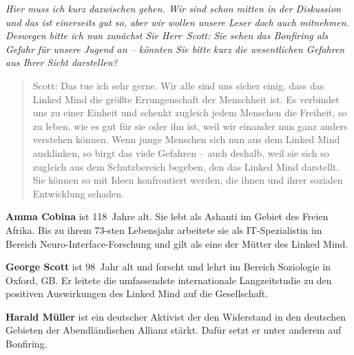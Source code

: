 \documentclass{scrartcl}
\newenvironment{frage}{\itshape}{}
\newenvironment{antworta}{
  \begin{quotation}
  }{
  \end{quotation}
}
\newcommand{\name}[1]{\textbf{#1}}
\newenvironment{infobox}{%
  \begin{tcolorbox}[width=\linewidth,
     boxsep=10pt,
     left=0pt,
     right=0pt,
     top=10pt,
     title=Zu den Personen,
     ]%
   }{%
   \end{tcolorbox}%
}
\begin{document}
\begin{frage}
Hier muss ich kurz dazwischen gehen. Wir sind schon mitten
  in der Diskussion und das ist einerseits gut so, aber wir
  wollen unsere Leser doch auch mitnehmen. Deswegen bitte
  ich nun zunächst Sie Herr~Scott: Sie sehen das Bonfiring
  als Gefahr für unsere Jugend an – könnten Sie bitte kurz
  die wesentlichen Gefahren aus Ihrer Sicht darstellen?
\end{frage}


\begin{antworta}
Scott: Das tue ich sehr gerne. Wir alle sind uns sicher
    einig, dass das Linked Mind die größte Errungenschaft
    der Menschheit ist. Es verbindet uns zu einer Einheit
    und schenkt zugleich jedem Menschen die Freiheit, so zu
    leben, wie es gut für sie oder ihn ist, weil wir
    einander nun ganz anders verstehen können. Wenn junge
    Menschen sich nun aus dem Linked Mind ausklinken, so
    birgt das viele Gefahren – auch deshalb, weil sie sich
    so zugleich aus dem Schutzbereich begeben, den das
    Linked Mind darstellt. Sie können so mit Ideen
    konfrontiert werden, die ihnen und ihrer sozialen
    Entwicklung schaden.
\end{antworta}


\begin{infobox}
\name{Amma Cobina} ist 118~Jahre alt. Sie lebt als Ashanti im
Gebiet des Freien Afrika. Bis zu ihrem 73-sten Lebensjahr
arbeitete sie als IT-Spezialistin im Bereich
Neuro-Interface-Forschung und gilt als eine der Mütter des
Linked Mind.

\name{George Scott} ist 98~Jahr alt und forscht und lehrt im
Bereich Soziologie in Oxford, GB. Er leitete die
umfassendste internationale Langzeitstudie zu den positiven
Auswirkungen des Linked Mind auf die Gesellschaft.

\name{Harald Müller} ist ein deutscher Aktivist der den
Widerstand in den deutschen Gebieten der Abendländischen
Allianz stärkt. Dafür setzt er unter anderem auf Bonfiring.
\end{infobox}
\end{document}

